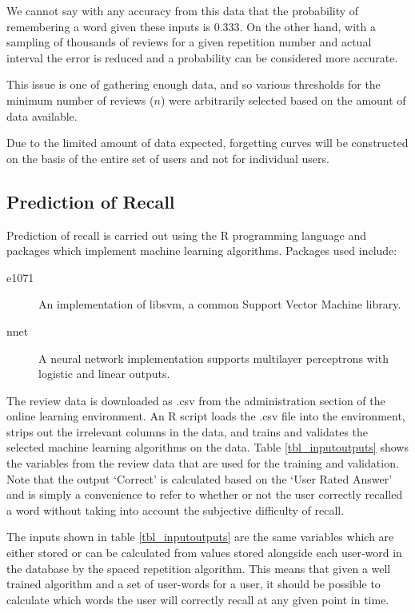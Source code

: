 We cannot say with any accuracy from this data that the probability of remembering a word
given these inputs is 0.333. On the other hand, with a sampling of thousands of reviews for a
given repetition number and actual interval the error is reduced and a probability can
be considered more accurate.

This issue is one of gathering enough data, and so various thresholds for the minimum number of reviews ($n$)
 were arbitrarily selected based on the amount of data available.

Due to the limited amount of data expected, forgetting curves will be constructed on the basis of
the entire set of users and not for individual users.

\subsection{Prediction of Recall}

Prediction of recall is carried out using the R programming language and packages
which implement machine learning algorithms. Packages used include:
\begin{description}
\item[e1071] An implementation of libsvm, a common Support Vector Machine library.
\item[nnet] A neural network implementation supports multilayer perceptrons with 
logistic and linear outputs.
\end{description}

The review data is downloaded as .csv from the administration section of the online
learning environment. An R script loads the .csv file into the environment, strips
out the irrelevant columns in the data, and trains and validates the selected 
machine learning algorithms on the data. Table \ref{tbl_inputoutputs} shows
the variables from the review data that are used for the training
and validation. Note that the output `Correct' is calculated based on the `User
Rated Answer' and is simply a convenience to refer to whether or
not the user correctly recalled a word without taking into account the subjective
difficulty of recall.

The inputs shown in table \ref{tbl_inputoutputs} are the same variables which are
either stored or can be calculated from values stored alongside each user-word in
the database by the spaced repetition algorithm. This means that given a well
trained algorithm and a set of user-words for a user, it should be possible to
calculate which words the user will correctly recall at any given point in time.

